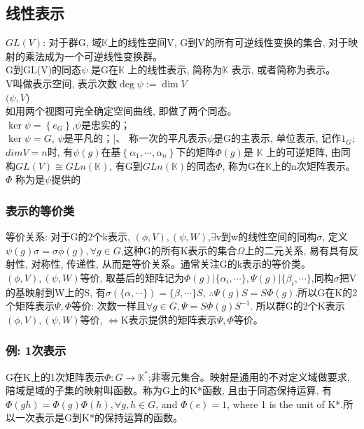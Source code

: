 \documentclass[UTF8]{../09-Mathematics}
\begin{document}
\subsection{线性表示}
$GL(V)$: 对于群G, 域$\mathbb K$上的线性空间V, G到V的所有可逆线性变换的集合, 对于映射的乘法成为一个可逆线性变换群。\\
G到GL(V)的同态$\psi $ 是G在$\mathbb K$ 上的线性表示, 简称为$\mathbb K$ 表示, 或者简称为表示。\\
V叫做表示空间, 表示次数$\deg \psi := \dim V$\\
$(\psi ,V$)\\
如用两个视图可完全确定空间曲线, 即做了两个同态。\\
$\ker \psi =\left\{ e_G \right\}$,$\psi $是忠实的；\\
$\ker \psi =G$, $\psi$是平凡的；|、
称一次的平凡表示$\psi $是G的主表示, 单位表示, 记作$1_G$;\\
$dimV=n$时, 有$\psi (g)$在基$\left\{ \alpha_1,\cdots , \alpha_n \right\}$下的矩阵$\Phi(g)$是 $\mathbb K$ 上的可逆矩阵, 由同构$GL(V) \cong GLn(\mathbb K)$, 有G到$GLn(\mathbb K)$的同态$\Phi$, 称为G在$\mathbb K$上的n次矩阵表示。\\
$\Phi $ 称为是$\psi $提供的

\subsubsection{表示的等价类}
等价关系: 对于G的2个k表示, $(\phi,V),(\psi,W)$,$\exists$v到w的线性空间的同构$\sigma$, 定义$\psi(g)\sigma =\sigma \phi (g), \forall g \in G$,这种G的所有K表示的集合$\Omega$上的二元关系, 易有具有反射性, 对称性, 传递性, 从而是等价关系。通常关注G的k表示的等价类。\\
$(\phi,V),(\psi,W)$等价, 取基后的矩阵记为$\Phi (g)| \{\alpha _i, \cdots\},\Psi (g)| \{\beta _i, \cdots\}$,同构$\sigma$把V的基映射到W上的S, 有$\sigma (\{\alpha , \cdots\})=\{\beta, \cdots\}S$, $\therefore \Psi (g)S=S\Phi(g)$.所以G在K的2个矩阵表示$\Psi, \Phi$等价: 次数一样且$\forall g \in G,\Psi =S\Phi (g)S^{-1}$. 所以群G的2个K表示$(\phi,V),(\psi,W)$等价, $\Leftrightarrow$K表示提供的矩阵表示$\Psi, \Phi$等价。
\subsubsection{例: 1次表示}
G在K上的1次矩阵表示$\Phi: G \to \mathbb K^*$;非零元集合。映射是通用的不对定义域做要求, 陪域是域的子集的映射叫函数。称为G上的K*函数, 且由于同态保持运算, 有$\Phi (gh)=\Phi (g)\Phi(h), \forall g,h \in G$, and $\Phi(e)=1$, where 1 is the unit of K*.所以一次表示是G到K*的保持运算的函数。
\end{document}
